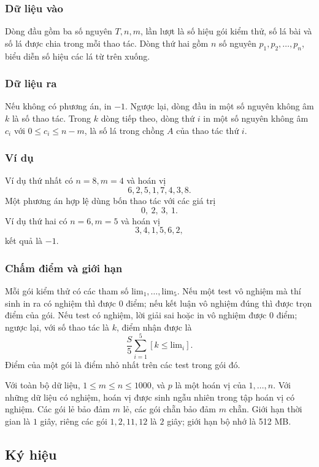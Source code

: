 \documentclass[11pt]{article}
\begin{document}
\subsubsection{Dữ liệu vào}

Dòng đầu gồm ba số nguyên $T,n,m$, lần lượt là số hiệu gói kiểm thử, số lá bài
và số lá được chia trong mỗi thao tác. Dòng thứ hai gồm $n$ số nguyên
$p_1,p_2,\ldots,p_n$, biểu diễn số hiệu các lá từ trên xuống.

\subsubsection{Dữ liệu ra}

Nếu không có phương án, in $-1$. Ngược lại, dòng đầu in một số nguyên không âm
$k$ là số thao tác. Trong $k$ dòng tiếp theo, dòng thứ $i$ in một số nguyên
không âm $c_i$ với $0\le c_i\le n-m$, là số lá trong chồng $A$ của thao tác thứ
$i$.

\subsubsection{Ví dụ}

Ví dụ thứ nhất có $n=8,m=4$ và hoán vị
\[
  6,2,5,1,7,4,3,8.
\]
Một phương án hợp lệ dùng bốn thao tác với các giá trị
\[
  0,\ 2,\ 3,\ 1.
\]
Ví dụ thứ hai có $n=6,m=5$ và hoán vị
\[
  3,4,1,5,6,2,
\]
kết quả là $-1$.

\subsubsection{Chấm điểm và giới hạn}

Mỗi gói kiểm thử có các tham số $\mathrm{lim}_1,\ldots,\mathrm{lim}_5$. Nếu một
test vô nghiệm mà thí sinh in ra có nghiệm thì được $0$ điểm; nếu kết luận vô
nghiệm đúng thì được trọn điểm của gói. Nếu test có nghiệm, lời giải sai hoặc
in vô nghiệm được $0$ điểm; ngược lại, với số thao tác là $k$, điểm nhận được là
\[
  \frac S5\sum_{i=1}^5 [k\le \mathrm{lim}_i].
\]
Điểm của một gói là điểm nhỏ nhất trên các test trong gói đó.

Với toàn bộ dữ liệu, $1\le m\le n\le 1000$, và $p$ là một hoán vị của
$1,\ldots,n$. Với những dữ liệu có nghiệm, hoán vị được sinh ngẫu nhiên trong
tập hoán vị có nghiệm. Các gói lẻ bảo đảm $m$ lẻ, các gói chẵn bảo đảm $m$ chẵn.
Giới hạn thời gian là $1$ giây, riêng các gói $1,2,11,12$ là $2$ giây; giới hạn
bộ nhớ là 512 MB.

\subsection{Ký hiệu}
\end{document}
